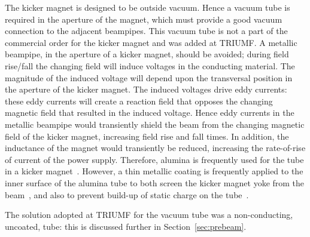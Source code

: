 \documentclass[aps,prab,twocolumn,superscriptaddress]{revtex4-1}
\begin{document}
The kicker magnet is designed to be outside vacuum. Hence a vacuum tube is required in the aperture of the magnet, which must provide a good vacuum connection to the adjacent beampipes. This vacuum tube is not a part of the commercial order for the kicker magnet and was added at TRIUMF. A metallic beampipe,  in the aperture of a kicker magnet, should be avoided; during field rise/fall the changing field will induce voltages in the conducting material. The magnitude of the induced voltage will depend upon the transversal position in the aperture of the kicker magnet. The induced voltages drive eddy currents: these eddy currents will create a reaction field that opposes the changing magnetic field that resulted in the induced voltage. Hence eddy currents in the metallic beampipe would transiently shield the beam from the changing magnetic field of the kicker magnet,  increasing field rise and fall times. In addition, the inductance of the magnet would transiently be reduced,  increasing the rate-of-rise of current of the power supply. Therefore, alumina is frequently used for the tube in a kicker magnet~\cite{PSI:Anicic2005, PAC07-Barnes, He2002, IPAC11-Pont, APAC01-Ghodke, IPAC12-Barnes}. However, a thin metallic coating is frequently applied to the inner surface of the alumina tube to both screen the kicker magnet yoke from the beam~\cite{He2002, IPAC11-Pont, APAC01-Ghodke, IPAC12-Barnes}, and also to prevent build-up of static charge on the tube~\cite{APAC01-Ghodke}. 


The solution adopted at TRIUMF for the vacuum tube was a non-conducting, uncoated, tube: this is discussed further in Section~\ref{sec:prebeam}.
\end{document}
